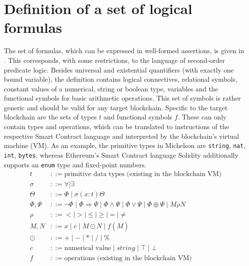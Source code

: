 \section{Definition of a set of logical formulas}\label{sec:formulae}
The set of formulas, which can be expressed in well-formed assertions, is given in . This corresponds, with some restrictions, to the language of second-order predicate logic. Besides universal and existential quantifiers (with exactly one bound variable), the definition contains logical connectives, relational symbols, constant values of a numerical, string or boolean type, variables and the functional symbols for basic arithmetic operations. This set of symbols is rather generic and should be valid for any target blockchain. Specific to the target blockchain are the sets of types $t$ and functional symbols $f$. These can only contain types and operations, which can be translated to instructions of the respective Smart Contract language and interpreted by the blockchain's virtual machine (VM). As an example, the primitive types in Michelson are \texttt{string}, \texttt{nat}, \texttt{int}, \texttt{bytes}, whereas Ethereum's Smart Contract language Solidity  \cite{solidity_docs} additionally supports an \texttt{enum} type and fixed-point numbers.
\begin{align*}
    t &::= \text{primitive data types (existing in the blockchain VM)} \\
    \sigma &::= \forall \mid \exists \\
    \Theta &::= \Phi \mid \sigma (x:t) \Theta \\
    \Phi,\Psi &::= \neg\Phi \mid \Phi \Rightarrow \Psi \mid \Phi\wedge\Psi \mid
    				\Phi\vee\Psi \mid \Phi \oplus \Psi \mid M \rho N \\
    \rho &::= < \mid > \mid \le \mid \ge \mid = \mid \ne \\
    M, N &::= x \mid c \mid M \odot N  \mid f (\overline M) \\
    \odot &::= +\mid -\mid * \mid / \mid \% \\
    c &::= \text{numerical value} \mid string \mid \top \mid \bot \\
    f &::= \text{operations (existing in the blockchain VM)}
\end{align*}
\begingroup\vspace*{-\baselineskip}
\label{fig:formulas}
\vspace*{\baselineskip}\endgroup

